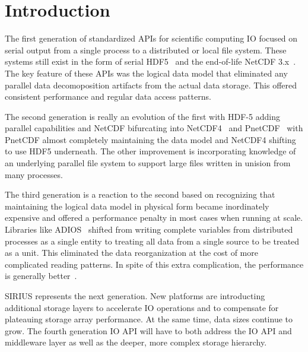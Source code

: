 \documentclass[letterpaper,twocolumn,10pt]{article}
\begin{document}
\section{Introduction}

The first generation of standardized APIs for scientific computing IO focused
on serial output from a single process to a distributed or local file system.
These systems still exist in the form of serial HDF5~\cite{chilan:2006:hdf5-performance} and the
end-of-life NetCDF 3.x~\cite{netcdf3}. The key feature of these APIs was the
logical data model that eliminated any parallel data decomoposition artifacts
from the actual data storage. This offered consistent performance and regular
data access patterns.

The second generation is really an evolution of the first with HDF-5 adding
parallel capabilities and NetCDF bifurcating into NetCDF4~\cite{rew:2011:netcdf-guide} and
PnetCDF~\cite{torrellas:2003:pnetcdf} with PnetCDF almost completely maintaining the data
model and NetCDF4 shifting to use HDF5 underneath. The other improvement is
incorporating knowledge of an underlying parallel file system to support large
files written in unision from many processes.

The third generation is a reaction to the second based on recognizing that
maintaining the logical data model in physical form became inordinately
expensive and offered a performance penalty in most cases when running at
scale. Libraries like ADIOS~\cite{lofstead:2009:adaptable} shifted from writing complete
variables from distributed processes as a single entity to treating all data
from a single source to be treated as a unit. This eliminated the data
reorganization at the cost of more complicated reading patterns. In spite of
this extra complication, the performance is generally
better~\cite{lofstead:2011:six-degrees}.

SIRIUS represents the next generation. New platforms are introducting
additional storage layers to accelerate IO operations and to compensate for
plateauing storage array performance. At the same time, data sizes continue
to grow. The fourth generation IO API will have to both address the IO API
and middleware layer as well as the deeper, more complex storage hierarchy.
\end{document}
